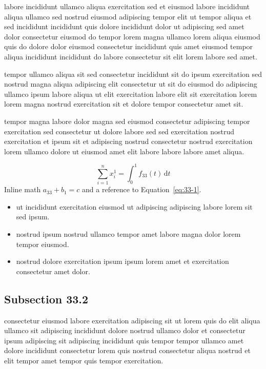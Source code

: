 \documentclass{article}
\begin{document}
labore incididunt ullamco aliqua exercitation sed et eiusmod labore incididunt aliqua ullamco sed nostrud eiusmod adipiscing tempor elit ut tempor aliqua et sed incididunt incididunt quis dolore incididunt dolor ut adipiscing sed amet dolor consectetur eiusmod do tempor lorem magna ullamco lorem aliqua eiusmod quis do dolore dolor eiusmod consectetur incididunt quis amet eiusmod tempor aliqua incididunt incididunt do labore consectetur sit elit lorem labore sed amet.

tempor ullamco aliqua sit sed consectetur incididunt sit do ipsum exercitation sed nostrud magna aliqua adipiscing elit consectetur ut sit do eiusmod do adipiscing ullamco ipsum labore aliqua ut elit exercitation labore elit sit exercitation lorem lorem magna nostrud exercitation sit et dolore tempor consectetur amet sit.

tempor magna labore dolor magna sed eiusmod consectetur adipiscing tempor exercitation sed consectetur ut dolore labore sed sed exercitation nostrud exercitation et ipsum sit et adipiscing nostrud consectetur nostrud exercitation lorem ullamco dolore ut eiusmod amet elit labore labore labore amet aliqua.

\begin{equation}\label{eq:33-1}
  \sum_{i=1}^{n} x_i^{1} = \int_0^1 f_{33}(t)\,\mathrm{d}t
\end{equation}
Inline math $a_{33} + b_{1} = c$ and a reference to Equation~\eqref{eq:33-1}.

\begin{itemize}
  \item ut incididunt exercitation eiusmod ut adipiscing adipiscing labore lorem sit sed ipsum.
  \item nostrud ipsum nostrud ullamco tempor amet labore magna dolor lorem tempor eiusmod.
  \item nostrud dolore exercitation ipsum ipsum lorem amet et exercitation consectetur amet dolor.
\end{itemize}

\subsection{Subsection 33.2}\label{sec:33-2}
consectetur eiusmod labore exercitation adipiscing sit ut lorem quis do elit aliqua ullamco sit adipiscing incididunt dolore nostrud ullamco dolor et consectetur ipsum adipiscing sit adipiscing incididunt quis tempor tempor ullamco amet dolore incididunt consectetur lorem quis nostrud consectetur aliqua nostrud et elit tempor amet tempor quis tempor exercitation.
\end{document}
